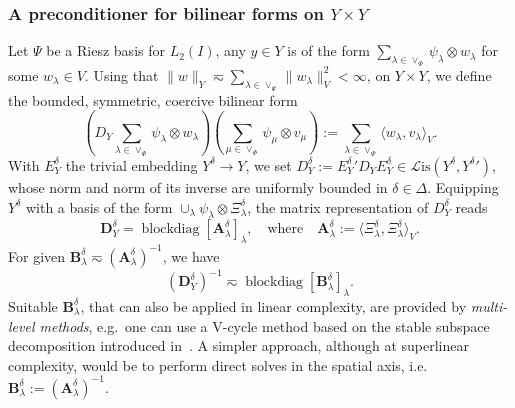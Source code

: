 \documentclass[11pt,a4paper,oneside,english]{amsart}
\numberwithin{equation}{section}
\numberwithin{theorem}{section}
\theoremstyle{definition}
\DeclareMathOperator{\blockdiag}{blockdiag}
\newcommand{\la}{\langle}
\newcommand{\ra}{\rangle}
\newcommand{\cL}{\mathcal L}
\newcommand{\Lis}{\cL\mathrm{is}}
\begin{document}
\subsubsection{A preconditioner for bilinear forms on $Y \times Y$}
Let $\Psi$ be a Riesz basis for $L_2(I)$, any $y \in Y$ is of the form
$\sum_{\lambda \in \vee_{\Phi}} \psi_\lambda \otimes w_\lambda$ for some $w_\lambda \in V$.
Using that $\|w\|_Y \eqsim \sum_{\lambda \in \vee_\Psi} \|w_\lambda\|_V^2 < \infty$,
on $Y \times Y$, we define the bounded, symmetric, coercive bilinear form
\[
  (D_Y \sum_{\lambda \in \vee_{\Phi}} \psi_\lambda \otimes w_\lambda)(\sum_{\mu \in \vee_{\Phi}} \psi_\mu \otimes v_\mu ) := \sum_{\lambda \in \vee_\Psi} \la w_\lambda, v_\lambda \ra_V.
\]
With $E_Y^\delta$ the trivial embedding $Y^\delta \to Y$,
we set $D_Y^\delta := {E_Y^\delta}' D_Y E_Y^\delta \in \Lis(Y^\delta, {Y^\delta}')$,
whose norm and norm of its inverse are uniformly bounded in $\delta \in \Delta$.
Equipping $Y^\delta$ with a basis of the form $\cup_\lambda \psi_\lambda \otimes \Xi_\lambda^\delta$,
the matrix representation of $D_Y^\delta$ reads
\[
  \mathbf D_Y^\delta = \blockdiag [\mathbf A_\lambda^\delta]_\lambda, \quad \text{where} \quad \mathbf A_\lambda^\delta := \la \Xi_\lambda^\delta, \Xi_\lambda^\delta \ra_V.
\]
For given $\mathbf B_\lambda^\delta \eqsim (\mathbf A_\lambda^\delta)^{-1}$, we have
\[
  (\mathbf D_Y^\delta)^{-1} \eqsim \blockdiag[\mathbf B_\lambda^\delta]_\lambda.
\]
Suitable $\mathbf B_\lambda^\delta$, that can also be applied in linear complexity, are provided by \emph{multi-level methods},
e.g.~one can use a V-cycle method based on the stable subspace decomposition introduced in~\cite{Wu2017}.
 A simpler approach, although at superlinear complexity, would be to perform direct
solves in the spatial axis, i.e.~$\mathbf B_\lambda^\delta := (\mathbf A_\lambda^\delta)^{-1}$.
\end{document}

